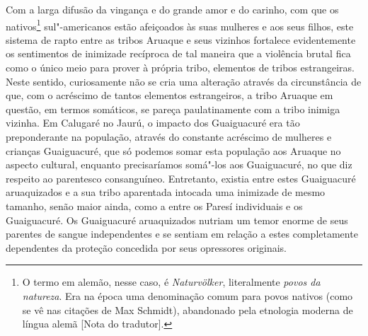 Com a larga difusão da vingança e do grande amor e do carinho, com que
os nativos\footnote[*]{O termo em alemão, nesse caso, é \emph{Naturvölker}, literalmente
  \emph{povos da natureza}. Era na época uma denominação comum para
  povos nativos (como se vê nas citações de Max Schmidt), abandonado
  pela etnologia moderna de língua alemã {[}Nota do tradutor{]}.} sul"-americanos estão afeiçoados às suas mulheres e aos seus
filhos, este sistema de rapto entre as tribos Aruaque e seus vizinhos
fortalece evidentemente os sentimentos de inimizade recíproca de tal
maneira que a violência brutal fica como o único meio para prover à
própria tribo, elementos de tribos estrangeiras. Neste sentido,
curiosamente não se cria uma alteração através da circunstância de que,
com o acréscimo de tantos elementos estrangeiros, a tribo Aruaque em
questão, em termos somáticos, se pareça paulatinamente com a tribo
inimiga vizinha. Em Calugaré no Jaurú, o impacto dos Guaiguacuré era tão
preponderante na população, através do constante acréscimo de mulheres e
crianças Guaiguacuré, que só podemos somar esta população aos Aruaque no
aspecto cultural, enquanto precisaríamos somá"-los aos Guaiguacuré, no
que diz respeito ao parentesco consanguíneo. Entretanto, existia entre
estes Guaiguacuré aruaquizados e a sua tribo aparentada intocada uma
inimizade de mesmo tamanho, senão maior ainda, como a entre os Paresí
individuais e os Guaiguacuré. Os Guaiguacuré aruaquizados nutriam um
temor enorme de seus parentes de sangue independentes e se sentiam em
relação a estes completamente dependentes da proteção concedida por seus
opressores originais.

